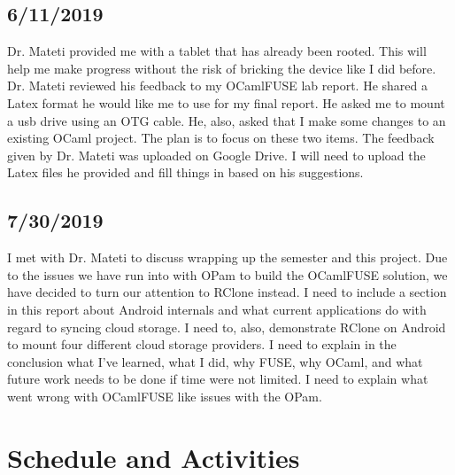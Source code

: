 \section{6/11/2019}
Dr. Mateti provided me with a tablet that has already been rooted. This will help me make progress without the risk of bricking the device like I did before. Dr. Mateti reviewed his feedback to my OCamlFUSE lab report. He shared a Latex format he would like me to use for my final report. He asked me to mount a usb drive using an OTG cable. He, also, asked that I make some changes to an existing OCaml project. The plan is to focus on these two items. The feedback given by Dr. Mateti was uploaded on Google Drive. I will need to upload the Latex files he provided and fill things in based on his suggestions.
\section{7/30/2019}
I met with Dr. Mateti to discuss wrapping up the semester and this project. Due to the issues we have run into with OPam to build the OCamlFUSE solution, we have decided to turn our attention to RClone instead. I need to include a section in this report about Android internals and what current applications do with regard to syncing cloud storage. I need to, also, demonstrate RClone on Android to mount four different cloud storage providers. I need to explain in the conclusion what I've learned, what I did, why FUSE, why OCaml, and what future work needs to be done if time were not limited. I need to explain what went wrong with OCamlFUSE like issues with the OPam.

\chapter{Schedule and Activities}
\label{schedule}

